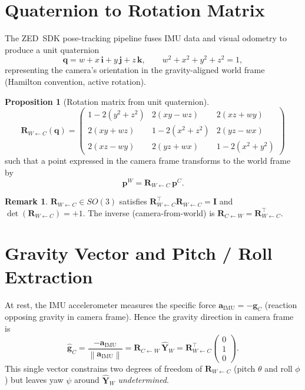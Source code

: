 \documentclass[11pt, a4paper]{article}
\newcommand{\vv}[1]{\bm{#1}}          %
\newcommand{\mat}[1]{\mathbf{#1}}     %
\newcommand{\quat}[1]{\bm{#1}}        %
\newcommand{\norm}[1]{\left\lVert #1 \right\rVert}
\newcommand{\Rtrans}[2]{\mat{R}_{#1 \leftarrow #2}}  %
\theoremstyle{definition}
\newtheorem{prop}{Proposition}
\newtheorem{remark}{Remark}
\begin{document}
\section{Quaternion to Rotation Matrix}

The ZED~SDK pose-tracking pipeline fuses IMU data and visual odometry to
produce a unit quaternion
\[
  \quat{q} = w + x\,\vv{i} + y\,\vv{j} + z\,\vv{k}, \qquad
  w^2 + x^2 + y^2 + z^2 = 1,
\]
representing the camera's orientation in the gravity-aligned world frame
(Hamilton convention, active rotation).

\begin{prop}[Rotation matrix from unit quaternion]
\[
  \Rtrans{W}{C}(\quat{q}) =
  \begin{pmatrix}
    1 - 2(y^2+z^2) & 2(xy - wz)     & 2(xz + wy) \\
    2(xy + wz)     & 1 - 2(x^2+z^2) & 2(yz - wx) \\
    2(xz - wy)     & 2(yz + wx)     & 1 - 2(x^2+y^2)
  \end{pmatrix}
\]
such that a point expressed in the camera frame transforms to the world frame by
\[
  \vv{p}^W = \Rtrans{W}{C}\,\vv{p}^C.
\]
\end{prop}

\begin{remark}
$\Rtrans{W}{C} \in SO(3)$ satisfies $\Rtrans{W}{C}^{\!\top}\Rtrans{W}{C} = \mat{I}$
and $\det(\Rtrans{W}{C}) = +1$.
The inverse (camera-from-world) is $\Rtrans{C}{W} = \Rtrans{W}{C}^{\!\top}$.
\end{remark}

\section{Gravity Vector and Pitch / Roll Extraction}

At rest, the IMU accelerometer measures the specific force
$\vv{a}_{\text{IMU}} = -\vv{g}_C$ (reaction opposing gravity in camera frame).
Hence the gravity direction in camera frame is
\[
  \hat{\vv{g}}_C
    = \frac{-\vv{a}_{\text{IMU}}}{\norm{\vv{a}_{\text{IMU}}}}
    = \Rtrans{C}{W}\,\hat{\vv{Y}}_W
    = \Rtrans{W}{C}^{\!\top}\begin{pmatrix}0\\1\\0\end{pmatrix}.
\]
This single vector constrains two degrees of freedom of $\Rtrans{W}{C}$
(pitch $\theta$ and roll $\phi$) but leaves yaw $\psi$ around $\hat{\vv{Y}}_W$
\emph{undetermined}.
\end{document}
